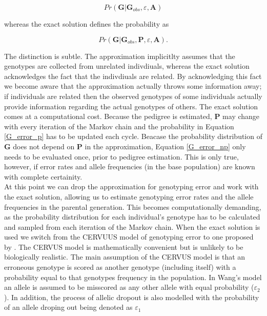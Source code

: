 \documentclass{article}
\begin{document}
\begin{equation}
Pr({\bm G} | {\bm G}_{obs}, {\varepsilon}, {\bm A})
\label{G_error_np}
\end{equation}

whereas the exact solution defines the probability as

\begin{equation}
Pr({\bm G} | {\bm G}_{obs}, {\bm P}, {\varepsilon}, {\bm A}).
\label{G_error_p}
\end{equation}

The distinction is subtle.  The approximation implicitlty assumes that the genotypes are collected from unrelated indivdiuals, whereas the exact solution acknowledges the fact that the indivdiuals are related.  By acknowledging this fact we become aware that the approximation actually throws some information away; if individuals are related then the observed genotypes of some individuals actually provide information regarding the actual genotypes of others. The exact solution comes at a computational cost.  Because the pedigree is estimated, ${\bm P}$ may change with every iteration of the Markov chain and the probability in Equation \ref{G_error_p} has to be updated each cycle.  Beacase the probability distribution of $\bm{G}$ does not depend on $\bm{P}$ in the approximation, Equation \ref{G_error_np} only needs to be evaluated once, prior to pedigree estimation.  This is only true, however, if error rates and allele frequencies (in the base population) are known with complete certainity.\\


 At this point we can drop the approximation for genotyping error and work with the exact solution, allowing us to estimate genotyping error rates and the allele frequencies in the parental generation. This becomes computationally demanding, as the probability distribution for each individual's genotype has to be calculated and sampled from each iteration of the Markov chain.  When the exact solution is used we switch from the CERVUUS model of genotyping error to one proposed by \citep{Wang.2004}.  The CERVUS model is mathematically convenient but is unlikely to be biologically realistic.  The main assumption of the CERVUS model is that an erroneous genotype is scored as another genotype (including itself) with a probability equal to that genotypes frequency in the population.  In Wang's model an allele is assumed to be misscored as any other allele with equal probability ($\varepsilon_{2}$).  In addition, the process of allelic dropout is also modelled with the probability of an allele droping out being denoted as $\varepsilon_{1}$
\end{document}
